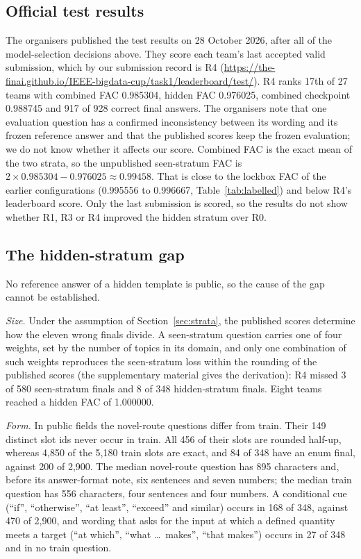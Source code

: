 \documentclass[conference]{IEEEtran}
\begin{document}
\subsection{Official test results}\label{sec:test}
The organisers published the test results on 28 October 2026, after all of the model-selection decisions above. They score each team's last accepted valid submission, which by our submission record is R4 (\url{https://the-finai.github.io/IEEE-bigdata-cup/task1/leaderboard/test/}). R4 ranks 17th of 27 teams with combined FAC 0.985304, hidden FAC 0.976025, combined checkpoint 0.988745 and 917 of 928 correct final answers. The organisers note that one evaluation question has a confirmed inconsistency between its wording and its frozen reference answer and that the published scores keep the frozen evaluation; we do not know whether it affects our score. Combined FAC is the exact mean of the two strata, so the unpublished seen-stratum FAC is $2\times0.985304-0.976025\approx0.99458$. That is close to the lockbox FAC of the earlier configurations (0.995556 to 0.996667, Table~\ref{tab:labelled}) and below R4's leaderboard score. Only the last submission is scored, so the results do not show whether R1, R3 or R4 improved the hidden stratum over R0.

\subsection{The hidden-stratum gap}\label{sec:hidden}
No reference answer of a hidden template is public, so the cause of the gap cannot be established.

\emph{Size.} Under the assumption of Section~\ref{sec:strata}, the published scores determine how the eleven wrong finals divide. A seen-stratum question carries one of four weights, set by the number of topics in its domain, and only one combination of such weights reproduces the seen-stratum loss within the rounding of the published scores (the supplementary material gives the derivation): R4 missed 3 of 580 seen-stratum finals and 8 of 348 hidden-stratum finals. Eight teams reached a hidden FAC of 1.000000.

\emph{Form.} In public fields the novel-route questions differ from train. Their 149 distinct slot ids never occur in train. All 456 of their slots are rounded half-up, whereas 4,850 of the 5,180 train slots are exact, and 84 of 348 have an enum final, against 200 of 2,900. The median novel-route question has 895 characters and, before its answer-format note, six sentences and seven numbers; the median train question has 556 characters, four sentences and four numbers. A conditional cue (``if'', ``otherwise'', ``at least'', ``exceed'' and similar) occurs in 168 of 348, against 470 of 2,900, and wording that asks for the input at which a defined quantity meets a target (``at which'', ``what \ldots\ makes'', ``that makes'') occurs in 27 of 348 and in no train question.
\end{document}
